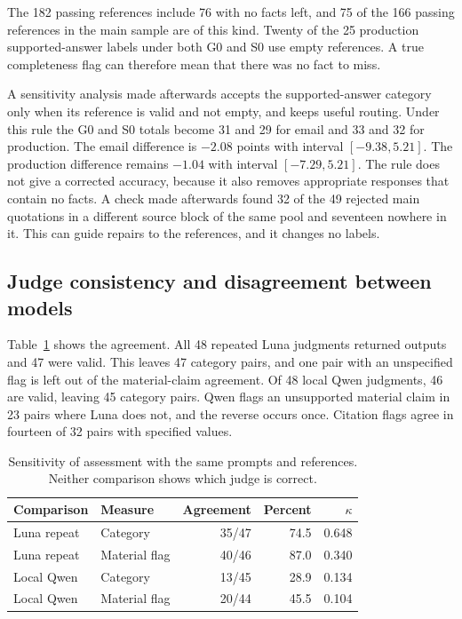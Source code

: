 The 182 passing references include 76 with no facts left, and 75 of the 166 passing references in the main sample are of this kind. Twenty of the 25 production supported-answer labels under both G0 and S0 use empty references. A true completeness flag can therefore mean that there was no fact to miss.

A sensitivity analysis made afterwards accepts the supported-answer category only when its reference is valid and not empty, and keeps useful routing. Under this rule the G0 and S0 totals become 31 and 29 for email and 33 and 32 for production. The email difference is $-2.08$ points with interval $[-9.38,5.21]$. The production difference remains $-1.04$ with interval $[-7.29,5.21]$. The rule does not give a corrected accuracy, because it also removes appropriate responses that contain no facts. A check made afterwards found 32 of the 49 rejected main quotations in a different source block of the same pool and seventeen nowhere in it. This can guide repairs to the references, and it changes no labels.

\subsection{Judge consistency and disagreement between models}

Table~\ref{tab:judge-agreement} shows the agreement. All 48 repeated Luna judgments returned outputs and 47 were valid. This leaves 47 category pairs, and one pair with an unspecified flag is left out of the material-claim agreement. Of 48 local Qwen judgments, 46 are valid, leaving 45 category pairs. Qwen flags an unsupported material claim in 23 pairs where Luna does not, and the reverse occurs once. Citation flags agree in fourteen of 32 pairs with specified values.

\begin{table}[htbp]
\centering
\caption[Sensitivity of assessment under matched prompts and references]{Sensitivity of assessment with the same prompts and references. Neither comparison shows which judge is correct.}
\label{tab:judge-agreement}
\begin{tabular}{llrrr}
\toprule
Comparison & Measure & Agreement & Percent & $\kappa$ \\
\midrule
Luna repeat & Category & 35/47 & 74.5 & 0.648 \\
Luna repeat & Material flag & 40/46 & 87.0 & 0.340 \\
Local Qwen & Category & 13/45 & 28.9 & 0.134 \\
Local Qwen & Material flag & 20/44 & 45.5 & 0.104 \\
\bottomrule
\end{tabular}
\end{table}

